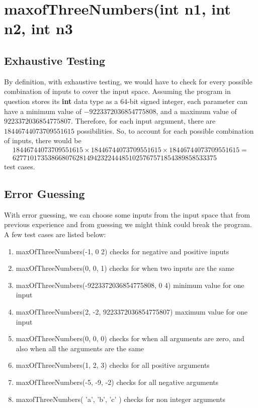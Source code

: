 \documentclass[letterpaper]{article}
\begin{document}
\section{maxofThreeNumbers(int n1, int n2, int n3}
\subsection{Exhaustive Testing}
By definition, with exhaustive testing, we would have to check for every
possible combination of inputs to cover the input space.
Assuming the program in question stores its
\textbf{int} data type as a 64-bit signed integer, each parameter can
have a minimum value of $-9223372036854775808$, and a maximum value of
$9223372036854775807$. Therefore, for each input argument, there are
$18446744073709551615$ possibilities. So, to account for each possible
combination of inputs, there would be
\begin{multline*}
	18446744073709551615 \times 18446744073709551615 \times 18446744073709551615 = \\ 6277101735386680762814942322444851025767571854389858533375
\end{multline*}
test cases.

\subsection{Error Guessing}
With error guessing, we can choose some inputs from the input space
that from previous experience and from guessing we might think could
break the program. A few test cases are listed below:

\begin{enumerate}
	\item maxOfThreeNumbers(-1, 0 2) checks for negative and positive inputs
	\item maxOfThreeNumbers(0, 0, 1) checks for when two inputs are the same
	\item maxOfThreeNumbers(-9223372036854775808, 0 4) minimum value for one input
	\item maxOfThreeNumbers(2, -2, 9223372036854775807) maximum value for one input
	\item maxOfThreeNumbers(0, 0, 0) checks for when all arguments are zero, and also when all the arguments are the same
	\item maxOfThreeNumbers(1, 2, 3) checks for all positive arguments
	\item maxOfThreeNumbers(-5, -9, -2) checks for all negative arguments
	\item maxofThreeNumbers( 'a', 'b', 'c' ) checks for non integer arguments
\end{enumerate}
\end{document}
